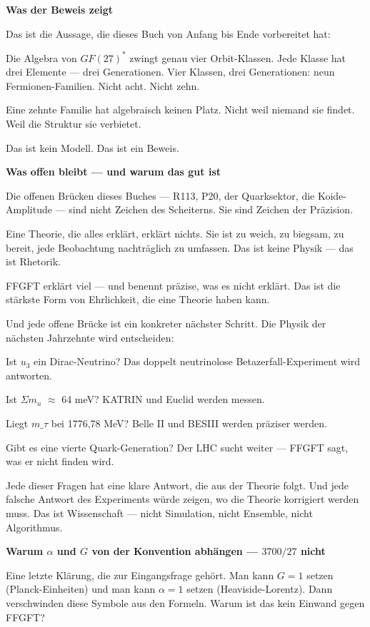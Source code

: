 \documentclass[11pt,oneside]{book}
\begin{document}
\textbf{Was der Beweis zeigt}


Das ist die Aussage, die dieses Buch von Anfang bis Ende vorbereitet hat:


Die Algebra von $GF(27)^*$ zwingt genau vier Orbit-Klassen. Jede Klasse
hat drei Elemente — drei Generationen. Vier Klassen, drei Generationen:
neun Fermionen-Familien. Nicht acht. Nicht zehn.


Eine zehnte Familie hat algebraisch keinen Platz. Nicht weil niemand
sie findet. Weil die Struktur sie verbietet.


Das ist kein Modell. Das ist ein Beweis.


\textbf{Was offen bleibt — und warum das gut ist}


Die offenen Brücken dieses Buches — R113, P20, der Quarksektor, die
Koide-Amplitude — sind nicht Zeichen des Scheiterns. Sie sind Zeichen
der Präzision.


Eine Theorie, die alles erklärt, erklärt nichts. Sie ist zu weich, zu
biegsam, zu bereit, jede Beobachtung nachträglich zu umfassen. Das ist
keine Physik — das ist Rhetorik.


FFGFT erklärt viel — und benennt präzise, was es nicht erklärt. Das
ist die stärkste Form von Ehrlichkeit, die eine Theorie haben kann.


Und jede offene Brücke ist ein konkreter nächster Schritt. Die Physik
der nächsten Jahrzehnte wird entscheiden:


Ist $
u_3$ ein Dirac-Neutrino? Das doppelt neutrinolose Betazerfall-Experiment
wird antworten.


Ist $\Sigma m_
u$ $\approx$ 64 meV? KATRIN und Euclid werden messen.


Liegt $m\_\tau$ bei 1776,78 MeV? Belle II und BESIII werden präziser werden.


Gibt es eine vierte Quark-Generation? Der LHC sucht weiter — FFGFT
sagt, was er nicht finden wird.


Jede dieser Fragen hat eine klare Antwort, die aus der Theorie folgt.
Und jede falsche Antwort des Experiments würde zeigen, wo die Theorie
korrigiert werden muss. Das ist Wissenschaft — nicht Simulation,
nicht Ensemble, nicht Algorithmus.


\textbf{Warum $\alpha$ und $G$ von der Konvention abhängen — $3700/27$ nicht}


Eine letzte Klärung, die zur Eingangsfrage gehört. Man kann $G=1$ setzen
(Planck-Einheiten) und man kann $\alpha=1$ setzen (Heaviside-Lorentz).
Dann verschwinden diese Symbole aus den Formeln. Warum ist das kein
Einwand gegen FFGFT?
\end{document}
